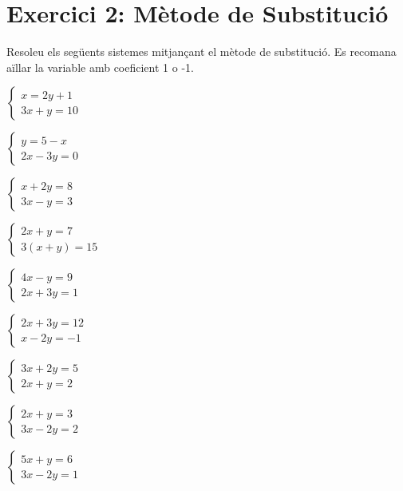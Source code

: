 \documentclass[12pt,a4paper]{article}
\begin{document}
\newpage

\section*{Exercici 2: Mètode de Substitució}
Resoleu els següents sistemes mitjançant el mètode de substitució. Es recomana aïllar la variable amb coeficient 1 o -1.

\begin{enumerate}[label=\alph*), itemsep=1cm]
    \begin{minipage}[t]{0.45\textwidth}
    \item $\begin{cases} x = 2y + 1 \\ 3x + y = 10 \end{cases}$
    \item $\begin{cases} y = 5 - x \\ 2x - 3y = 0 \end{cases}$
    \item $\begin{cases} x + 2y = 8 \\ 3x - y = 3 \end{cases}$
    \item $\begin{cases} 2x + y = 7 \\ 3(x + y) = 15 \end{cases}$
    \item $\begin{cases} 4x - y = 9 \\ 2x + 3y = 1 \end{cases}$
    \item $\begin{cases} 2x + 3y = 12 \\ x - 2y = -1 \end{cases}$
    \end{minipage}
    \begin{minipage}[t]{0.45\textwidth}
    \item $\begin{cases} 3x + 2y = 5 \\ 2x + y = 2 \end{cases}$
    \item $\begin{cases} 2x + y = 3 \\ 3x - 2y = 2 \end{cases}$
    \item $\begin{cases} 5x + y = 6 \\ 3x - 2y = 1 \end{cases}$

\end{minipage}
\end{enumerate}
\end{document}
